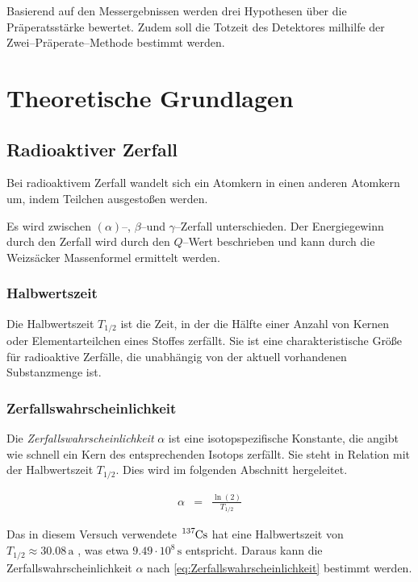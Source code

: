 \documentclass[12pt,a4paper]{scrartcl}
\numberwithin{equation}{section} %
\begin{document}
Basierend auf den Messergebnissen werden drei Hypothesen über die Präperatsstärke bewertet. Zudem soll die Totzeit des Detektores milhilfe der Zwei--Präperate--Methode bestimmt werden.

\clearpage
\hypertarget{theoretische-grundlagen}{%
\section{Theoretische Grundlagen}\label{theoretische-grundlagen}}
\hypertarget{Radioaktiver Zerfall}{\subsection{Radioaktiver Zerfall}\label{Radioaktiver Zerfall}}
Bei radioaktivem Zerfall wandelt sich ein Atomkern in einen anderen Atomkern um, indem Teilchen ausgestoßen werden.

Es wird zwischen $(\alpha)$--, $\beta$--und $\gamma$--Zerfall unterschieden. Der Energiegewinn durch den Zerfall wird durch den $Q$--Wert beschrieben und kann durch die Weizsäcker Massenformel ermittelt werden.

\hypertarget{Halbwertszeit}{\subsubsection{Halbwertszeit}\label{Halbwertszeit}}
Die Halbwertszeit $T_{1/2}$ ist die Zeit, in der die Hälfte einer Anzahl von Kernen oder Elementarteilchen eines Stoffes zerfällt. Sie ist eine charakteristische Größe für radioaktive Zerfälle, die unabhängig von der aktuell vorhandenen Substanzmenge ist. \cite{Halbwertszeit}

\hypertarget{Zerfallswahrscheinlichkeit}{\subsubsection{Zerfallswahrscheinlichkeit}\label{Zerfallswahrscheinlichkeit}}
Die \emph{Zerfallswahrscheinlichkeit} $\alpha$ ist eine isotopspezifische Konstante, die angibt wie schnell ein Kern des entsprechenden Isotops zerfällt. Sie steht in Relation mit der Halbwertszeit $T_{1/2}$. Dies wird im folgenden Abschnitt hergeleitet.

\begin{eqnarray}
	\alpha &=& \frac{\ln{(2)}}{T_{1/2}} \label{eq:Zerfallswahrscheinlichkeit}
\end{eqnarray}

\noindent
Das in diesem Versuch verwendete $\ce{^{137}Cs}$ hat eine Halbwertszeit von $T_{1/2}\approx30.08\mathrm{\,a}$ \cite{Chart of Nuclides}, was etwa $9.49 \cdot 10^8 \mathrm{\,s}$ entspricht. Daraus kann die Zerfallswahrscheinlichkeit $\alpha$ nach \eqref{eq:Zerfallswahrscheinlichkeit} bestimmt werden.
\end{document}
